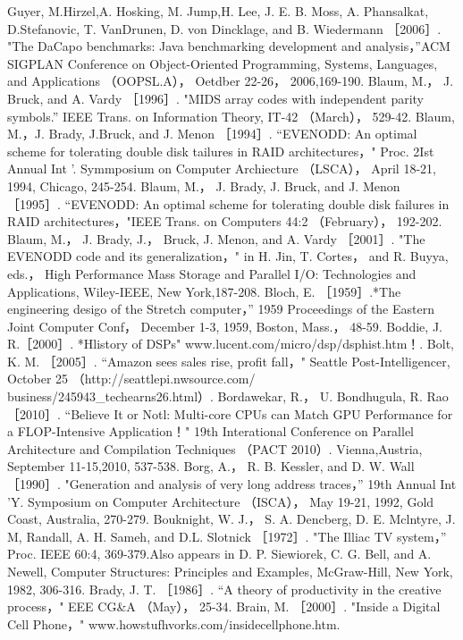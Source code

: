 Guyer, M.Hirzel,A. Hosking, M. Jump,H. Lee, J. E. B. Moss, A. Phansalkat, D.Stefanovic, T. VanDrunen, D. von
Dincklage, and B. Wiedermann ［2006］. "The DaCapo benchmarks: Java benchmarking development and analysis，”ACM
SIGPLAN Conference on Object-Oriented Programming, Systems, Languages, and Applications （OOPSL.A）， Oetdber 22-26，
2006,169-190.
Blaum, M.， J. Bruck, and A. Vardy ［1996］. "MIDS array codes with independent parity symbols.” IEEE Trans. on Information
Theory, IT-42 （March）， 529-42.
Blaum, M.，J. Brady, J.Bruck, and J. Menon ［1994］. “EVENODD: An optimal scheme for tolerating double disk tailures in RAID
architectures，" Proc. 2Ist Annual Int '. Symmposium on Computer Archiecture （LSCA）， April 18-21, 1994, Chicago, 245-254.
Blaum, M.， J. Brady, J. Bruck, and J. Menon ［1995］. “EVENODD: An optimal scheme for tolerating double disk failures in RAID
architectures，"IEEE Trans. on Computers 44:2 （February）， 192-202.
Blaum, M.， J. Brady, J.， Bruck, J. Menon, and A. Vardy ［2001］. "The EVENODD code and its generalization，" in H. Jin, T. Cortes，
and R. Buyya, eds.， High Performance Mass Storage and Parallel I/O: Technologies and Applications, Wiley-IEEE, New
York,187-208.
Bloch, E. ［1959］.*The engineering desigo of the Stretch computer，” 1959 Proceedings of the Eastern Joint Computer Conf，
December 1-3, 1959, Boston, Mass.， 48-59.
Boddie, J. R.［2000］. *Hlistory of DSPs" www.lucent.com/micro/dsp/dsphist.htm！.
Bolt, K. M. ［2005］. “Amazon sees sales rise, profit fall，" Seattle Post-Intelligencer, October 25 （http://seattlepi.nwsource.com/
business/245943_techearns26.html）.
Bordawekar, R.， U. Bondhugula, R. Rao ［2010］. “Believe It or Notl: Multi-core CPUs can Match GPU Performance for a
FLOP-Intensive Application！" 19th Interational Conference on Parallel Architecture and Compilation Techniques （PACT
2010）. Vienna,Austria, September 11-15,2010, 537-538.
Borg, A.， R. B. Kessler, and D. W. Wall ［1990］. "Generation and analysis of very long address traces，” 19th Annual Int 'Y.
Symposium on Computer Architecture （ISCA）， May 19-21, 1992, Gold Coast, Australia, 270-279.
Bouknight, W. J.， S. A. Dencberg, D. E. Mclntyre, J. M, Randall, A. H. Sameh, and D.L. Slotnick ［1972］. "The Illiac TV system，”
Proc. IEEE 60:4, 369-379.Also appears in D. P. Siewiorek, C. G. Bell, and A. Newell, Computer Structures: Principles and
Examples, McGraw-Hill, New York, 1982, 306-316.
Brady, J. T. ［1986］. “A theory of productivity in the creative process，" EEE CG&A （May）， 25-34.
Brain, M. ［2000］. "Inside a Digital Cell Phone，" www.howstufhvorks.com/insidecellphone.htm.
